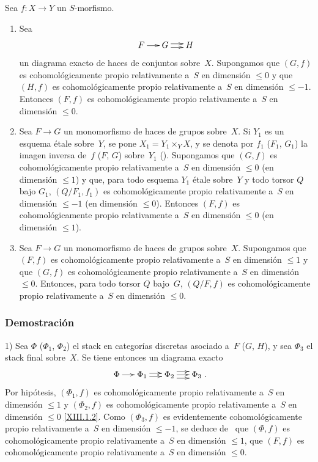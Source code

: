 
\begingroup
\shorthandoff{<>}%
\begin{proposition}
\label{XIII.1.13}
Sea $f \colon X \to Y$ un $S$-morfismo.
\begin{enumerate}
\item[1)] Sea
$$
\xymatrix@C=.5cm{ F \ar[r] & G \ar@<2pt>[r] \ar@<-2pt>[r] & H }
$$
un diagrama exacto de haces de conjuntos sobre~$X$. Supongamos que
$(G,f)$ es cohomológicamente propio relativamente a~$S$ en dimensión
$\leqslant 0$ y que $(H,f)$ es cohomológicamente propio relativamente
a~$S$ en dimensión $\leqslant -1$. Entonces $(F,f)$ es
cohomológicamente propio relativamente a~$S$ en dimensión
$\leqslant 0$.

\item[2)] Sea
$F \to G$ un monomorfismo de haces de grupos sobre~$X$. Si $Y_1$ es un
esquema étale sobre~$Y$, se pone $X_1 = Y_1 \times_Y X$, y se denota por
$f_1$ (\resp $F_1$, \resp $G_1$) la imagen inversa de~$f$ (\resp $F$,
\resp $G$) sobre~$Y_1$ (\cf {}). Supongamos que
$(G,f)$ es cohomológicamente propio relativamente a~$S$ en dimensión
$\leqslant 0$ (\resp en dimensión $\leqslant 1$) y que, para todo
esquema $Y_1$ étale sobre~$Y$ y todo torsor $Q$ bajo $G_1$,
$(Q/F_1,f_1)$ es cohomológicamente propio relativamente a~$S$ en
dimensión $\leqslant -1$ (\resp en dimensión $\leqslant 0$). Entonces
$(F,f)$ es cohomológicamente propio relativamente a~$S$ en dimensión
$\leqslant 0$ (\resp en dimensión $\leqslant 1$).

\item[3)] Sea $F \to G$ un monomorfismo de haces de grupos sobre~$X$.
Supongamos que $(F,f)$ es cohomológicamente propio relativamente a~$S$
en dimensión $\leqslant 1$ y que $(G,f)$ es cohomológicamente propio
relativamente a~$S$ en dimensión $\leqslant 0$. Entonces, para todo
torsor $Q$ bajo~$G$, $(Q/F,f)$ es cohomológicamente propio relativamente
a~$S$ en dimensión $\leqslant 0$.
\end{enumerate}
\end{proposition}

\subsubsection*{Demostración}
1) Sea $\Phi$ (\resp $\Phi_1$, \resp $\Phi_2$) el stack en categorías
discretas asociado a~$F$ (\resp $G$, \resp $H$), y sea $\Phi_3$ el stack
final sobre~$X$. Se tiene entonces un diagrama exacto
$$
\xymatrix@C=.5cm{ \Phi \ar[r] & \Phi_1 \ar@<2pt>[r] \ar@<-2pt>[r] &
\Phi_2 \ar@<4pt>[r] \ar[r] \ar@<-4pt>[r] & \Phi_3 }
\text{.}
$$
Por hipótesis, $(\Phi_1,f)$ es cohomológicamente propio relativamente
a~$S$ en dimensión $\leqslant 1$ y $(\Phi_2,f)$ es cohomológicamente
propio relativamente a~$S$ en dimensión $\leqslant 0$
\eqref{XIII.1.2}. Como $(\Phi_3,f)$ es evidentemente cohomológicamente
propio relativamente a~$S$ en dimensión $\leqslant -1$, se deduce
de~ que $(\Phi,f)$ es cohomológicamente propio
relativamente a~$S$ en dimensión $\leqslant 1$, \ie que $(F,f)$ es
cohomológicamente propio relativamente a~$S$ en dimensión
$\leqslant 0$.

